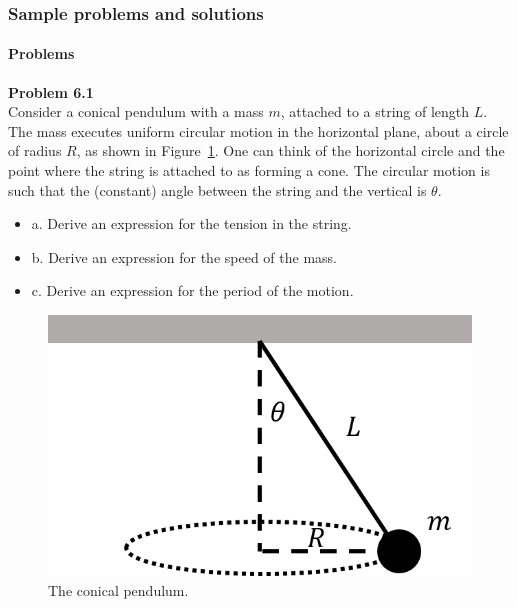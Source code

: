 \subsubsection{Sample problems and solutions}

\paragraph{Problems}

\begin{framed}
\textbf{Problem 6.1}\\
Consider a conical pendulum with a mass $m$, attached to a string of length $L$. The mass executes uniform circular motion in the horizontal plane, about a circle of radius $R$, as shown in Figure~\ref{fig:applyingnewtonslaws:conicalpendulum}. One can think of the horizontal circle and the point where the string is attached to as forming a cone. The circular motion is such that the (constant) angle between the string and the vertical is $\theta$.

\begin{itemize}
\item a. Derive an expression for the tension in the string.
\item b.  Derive an expression for the speed of the mass.
\item c. Derive an expression for the period of the motion.
\end{itemize}

\begin{figure}[!htbp]
\centering
\includegraphics[width=0.3\linewidth]{files/conicalpendulum-909c2cb489ad7ac70f1f338395013c5c.png}
\caption[]{The conical pendulum.}
\label{fig:applyingnewtonslaws:conicalpendulum}
\end{figure}
\end{framed}

